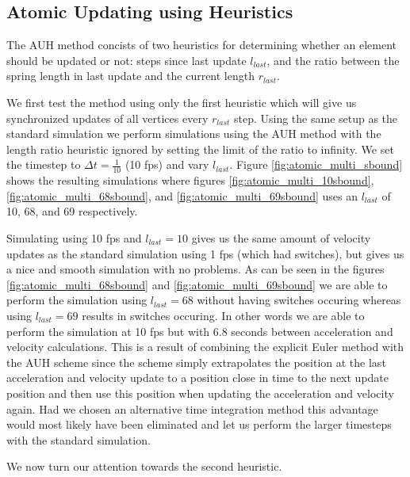\documentclass[11pt]{article}
\begin{document}
\subsection{Atomic Updating using Heuristics}
The AUH method concists of two heuristics for determining whether an element
should be updated or not: steps since last update $l_{last}$, and the ratio
between the spring length in last update and the current length $r_{last}$.

We first test the method using only the first heuristic which will give
us synchronized updates of all vertices every $r_{last}$ step. Using the
same setup as the standard simulation we perform simulations using the AUH
method with the length ratio heuristic ignored by setting the limit of
the ratio to infinity. We set the timestep to $\Delta t = \frac{1}{10}$
(10 fps) and vary $l_{last}$. Figure \ref{fig:atomic_multi_sbound} shows
the resulting simulations where figures \ref{fig:atomic_multi_10sbound},
\ref{fig:atomic_multi_68sbound}, and \ref{fig:atomic_multi_69sbound} uses
an $l_{last}$ of 10, 68, and 69 respectively.

Simulating using 10 fps and $l_{last} = 10$ gives us the same amount
of velocity updates as the standard simulation using 1 fps (which had
switches), but gives us a nice and smooth simulation with no problems.
As can be seen in the figures \ref{fig:atomic_multi_68sbound} and
\ref{fig:atomic_multi_69sbound} we are able to perform the simulation using
$l_{last} = 68$ without having switches occuring whereas using $l_{last} =
69$ results in switches occuring. In other words we are able to perform the
simulation at 10 fps but with 6.8 seconds between acceleration and velocity
calculations. This is a result of combining the explicit Euler method with
the AUH scheme since the scheme simply extrapolates the position at the last
acceleration and velocity update to a position close in time to the next
update position and then use this position when updating the acceleration and
velocity again. Had we chosen an alternative time integration method this
advantage would most likely have been eliminated and let us perform the larger
timesteps with the standard simulation.

We now turn our attention towards the second heuristic.
\end{document}
